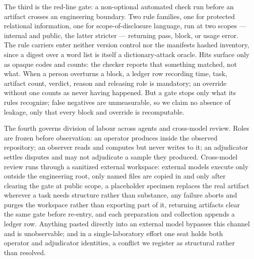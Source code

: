 \documentclass[
  english,
]{article}
\begin{document}
The third is the red-line gate: a non-optional automated check run before an artifact crosses an engineering boundary. Two rule families, one for protected relational information, one for scope-of-disclosure language, run at two scopes --- internal and public, the latter stricter --- returning pass, block, or usage error. The rule carriers enter neither version control nor the manifest\textquotesingle s hashed inventory, since a digest over a word list is itself a dictionary-attack oracle. Hits surface only as opaque codes and counts: the checker reports that something matched, not what. When a person overturns a block, a ledger row recording time, task, artifact count, verdict, reason and releasing role is mandatory; an override without one counts as never having happened. But a gate stops only what its rules recognize; false negatives are unmeasurable, so we claim no absence of leakage, only that every block and override is recomputable.

The fourth governs division of labour across agents and cross-model review. Roles are frozen before observation: an operator produces inside the observed repository; an observer reads and computes but never writes to it; an adjudicator settles disputes and may not adjudicate a sample they produced. Cross-model review runs through a sanitized external workspace: external models execute only outside the engineering root, only named files are copied in and only after clearing the gate at public scope, a placeholder specimen replaces the real artifact wherever a task needs structure rather than substance, any failure aborts and purges the workspace rather than exporting part of it, returning artifacts clear the same gate before re-entry, and each preparation and collection appends a ledger row. Anything pasted directly into an external model bypasses this channel and is unobservable; and in a single-laboratory effort one seat holds both operator and adjudicator identities, a conflict we register as structural rather than resolved.
\end{document}
